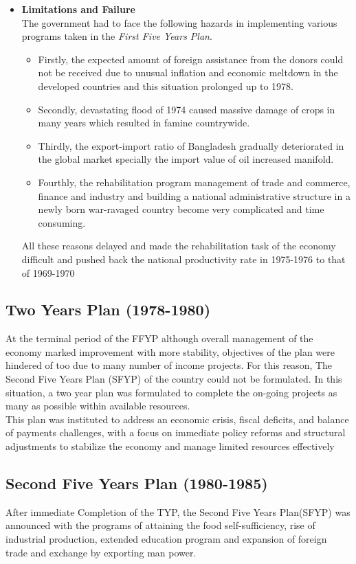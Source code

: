\begin{itemize}
	\item\textbf{Limitations and Failure}\\
	The government had to face the following hazards in implementing various programs taken 
	in the \textit{First Five Years Plan}.
	\begin{itemize}
		\item Firstly, the expected amount of foreign assistance from the donors could 
		not be received due to unusual inflation and economic meltdown in the developed 
		countries and this situation prolonged up to 1978.
		\item Secondly, devastating flood of 1974 caused massive damage of crops in 
		many years which resulted in famine countrywide.
		\item Thirdly, the export-import ratio of Bangladesh gradually deteriorated 
		in the global market specially the import value of oil increased manifold.
		\item Fourthly, the rehabilitation program management of trade and commerce, 
		finance and industry and building a national administrative structure in a 
		newly born war-ravaged country become very complicated and time consuming.
	\end{itemize}
	
All these reasons delayed and made the rehabilitation task of the economy difficult and pushed back 
the national productivity rate in 1975-1976 to that of 1969-1970
	
\end{itemize}

\subsection{Two Years Plan (1978-1980)}
At the terminal period of the FFYP although overall management of the economy marked
improvement with more stability, objectives of the plan were hindered of too due to many
number of income projects. For this reason, The Second Five Years Plan (SFYP) of the
country could not be formulated. In this situation, a two year plan was formulated to complete
the on-going projects as many as possible within available resources.\\

This plan was instituted to address an economic crisis, fiscal deficits, and balance of
payments challenges, with a focus on immediate policy reforms and structural adjustments
to stabilize the economy and manage limited resources effectively


\subsection{Second Five Years Plan (1980-1985)}
After immediate Completion of the TYP, the Second Five Years Plan(SFYP) was announced
with the programs of attaining the food self-sufficiency, rise of industrial production, 
extended education program and expansion of foreign trade and exchange by exporting man power.

